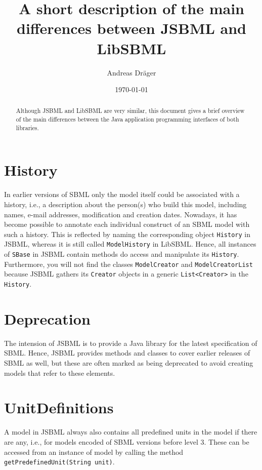 \documentclass[a4paper,11pt]{scrartcl}
\title{A short description of the main differences between JSBML and LibSBML}
\author{Andreas Dr\"ager}
\date{\today}
\begin{document}
\maketitle

\begin{abstract}
Although JSBML and LibSBML are very similar, this document gives a brief
overview of the main differences between the Java\texttrademark{} application
programming interfaces of both libraries.
\end{abstract}

\section{History}

In earlier versions of SBML only the model itself could be associated with a
history, i.e., a description about the person(s) who build this model, including
names, e-mail addresses, modification and creation dates. Nowadays, it has
become possible to annotate each individual construct of an SBML model with such
a history. This is reflected by naming the corresponding object \verb!History!
in JSBML, whereas it is still called \verb!ModelHistory! in LibSBML. Hence, all
instances of \verb!SBase! in JSBML contain methods do access and manipulate its
\verb!History!. Furthermore, you will not find the classes \verb!ModelCreator!
and \verb!ModelCreatorList! because JSBML gathers its \verb!Creator! objects
in a generic \verb!List<Creator>! in the \verb!History!.

\section{Deprecation}

The intension of JSBML is to provide a Java library for the latest 
specification of SBML. Hence, JSBML provides methods and classes to
cover earlier releases of SBML as well, but these are often marked
as being deprecated to avoid creating models that refer to these 
elements.

\section{UnitDefinitions}

A model in JSBML always also contains all predefined units in the model
if there are any, i.e., for models encoded of SBML versions before level
3. These can be accessed from an instance of model by calling the method
\verb!getPredefinedUnit(String unit)!.
\end{document}
